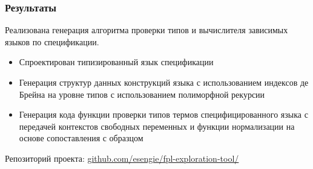 \begin{frame}
\frametitle{Результаты}
Реализована генерация алгоритма проверки типов и вычислителя зависимых языков по спецификации.

\begin{itemize}
\item Спроектирован типизированный язык спецификации
\item Генерация структур данных конструкций языка с использованием индексов де Брейна на уровне типов с использованием полиморфной рекурсии
\item Генерация кода функции проверки типов термов специфицированного языка с передачей контекстов свободных переменных и функции нормализации на основе сопоставления с образцом
\end{itemize}

Репозиторий проекта: \url{github.com/esengie/fpl-exploration-tool/}
\end{frame}
